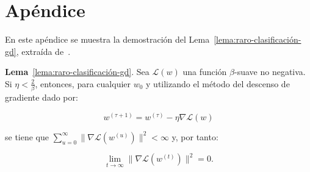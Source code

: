 
\chapter{Apéndice}\label{ap:apendiceA}

En este apéndice se muestra la demostración del Lema~\ref{lema:raro-clasificación-gd}, extraída de~\cite{Soudry2024}.\newline

\textbf{Lema}~\ref{lema:raro-clasificación-gd}. Sea $\mathcal{L}(w)$ una función $\beta$-suave no negativa. Si $\eta < \frac{2}{\beta}$, entonces, para cualquier $w_0$ y utilizando el método del descenso de gradiente dado por:

\[
    w^{(\tau + 1)} = w^{(\tau)} - \eta \nabla \mathcal{L}(w)
\]

se tiene que $\sum_{u=0}^{\infty} \| \nabla\mathcal{L}(w^{(u)}) \|^{2} < \infty$ y, por tanto:

\[
    \lim \limits_{t \to \infty} \| \nabla\mathcal{L}(w^{(t)}) \|^{2} = 0.
\]

